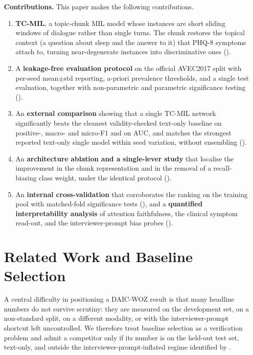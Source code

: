 \documentclass[conference]{IEEEtran}
\begin{document}
\textbf{Contributions.} This paper makes the following contributions.
\begin{enumerate}
\item \textbf{TC-MIL}, a topic-chunk MIL model whose instances are short
sliding windows of dialogue rather than single turns. The chunk restores the
topical context (a question about sleep and the answer to it) that PHQ-8
symptoms attach to, turning near-degenerate instances into discriminative
ones ().
\item A \textbf{leakage-free evaluation protocol} on the official AVEC2017
split with per-seed mean$\pm$std reporting, a-priori prevalence thresholds, and
a single test evaluation, together with non-parametric and parametric
significance testing ().
\item An \textbf{external comparison} showing that a single TC-MIL network
significantly beats the cleanest validity-checked text-only baseline on
positive-, macro- and micro-F1 and on AUC, and matches the strongest reported
text-only single model within seed variation, without ensembling
().
\item An \textbf{architecture ablation and a single-lever study} that localise
the improvement in the chunk representation and in the removal of a
recall-biasing class weight, under the identical protocol
().
\item An \textbf{internal cross-validation} that corroborates the ranking on
the training pool with matched-fold significance tests
(), and a \textbf{quantified interpretability
analysis} of attention faithfulness, the clinical symptom read-out, and the
interviewer-prompt bias probes ().
\end{enumerate}

\section{Related Work and Baseline Selection}
\label{sec:related}

A central difficulty in positioning a DAIC-WOZ result is that many headline
numbers do not survive scrutiny: they are measured on the development set, on a
non-standard split, on a different modality, or with the interviewer-prompt
shortcut left uncontrolled. We therefore treat baseline selection as a
verification problem and admit a competitor only if its number is on the
held-out test set, text-only, and outside the interviewer-prompt-inflated
regime identified by \cite{burdisso2024}.
\end{document}
